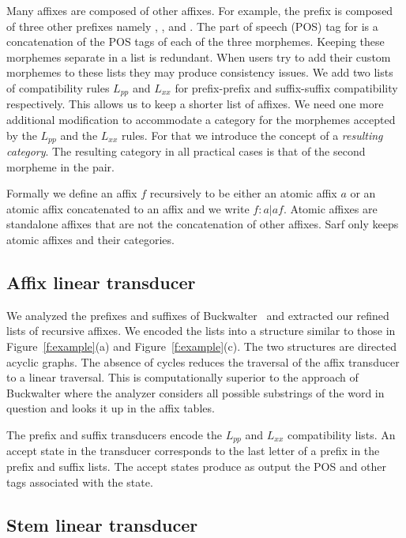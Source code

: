 \documentclass[11pt]{article}
\begin{document}
Many affixes are composed of other affixes. For example,
the prefix  is composed of three other prefixes
namely , , and .
The part of speech (POS) tag for  is a concatenation
of the POS tags of each of the three morphemes. 
Keeping these morphemes separate in a list
is redundant.
When users try to add their custom morphemes to these
lists they may produce consistency issues. 
We add two lists of compatibility rules $L_{pp}$ and
$L_{xx}$ for prefix-prefix and suffix-suffix compatibility
respectively.
This allows us to keep a shorter list of affixes. 
We need one more additional modification to accommodate 
a category for the morphemes accepted by the $L_{pp}$
and the $L_{xx}$ rules. For that we introduce the concept
of a {\em resulting category}. 
The resulting category in all practical cases
is that of the second morpheme in the pair. 

Formally we define an affix $f$ recursively to be either
an atomic affix $a$ or an atomic affix concatenated
to an affix and we write $f: a | a f$. 
Atomic affixes are standalone affixes
that are not the concatenation of other affixes. 
Sarf only keeps atomic affixes and their categories.

\subsection{Affix linear transducer}
\label{sec:affixFSA}

We analyzed the prefixes and suffixes of 
Buckwalter~
and extracted our refined lists of recursive affixes.
We encoded the lists into a structure similar to those
in Figure~\ref{f:example}(a) and Figure~\ref{f:example}(c).
The two structures are directed acyclic graphs. 
The absence of cycles reduces the 
traversal of the affix transducer to a linear traversal.
This is computationally superior to the 
approach of Buckwalter where the analyzer considers
all possible substrings of the word in question
and looks it up in the affix tables. 

The prefix and suffix transducers encode the $L_{pp}$ and
$L_{xx}$ compatibility lists.
An accept state in the transducer corresponds to the last letter 
of a prefix in the prefix and suffix lists.
The accept states produce as output the POS and other tags
associated with the state.

\subsection{Stem linear transducer}
\label{sec:stemFSA}
\end{document}
